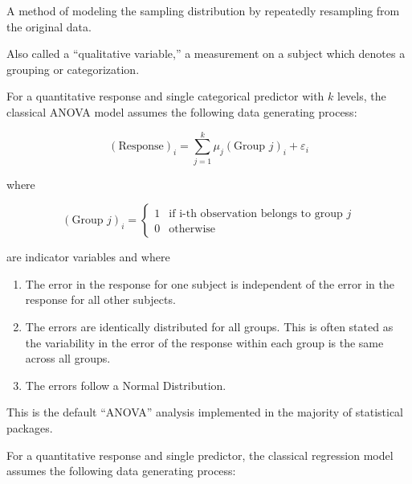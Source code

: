 \documentclass[
  letterpaper,
  DIV=11,
  numbers=noendperiod]{scrreprt}
\providecommand{\tightlist}{%
  \setlength{\itemsep}{0pt}\setlength{\parskip}{0pt}}\usepackage{longtable,booktabs,array}
\theoremstyle{plain}
\theoremstyle{definition}
\theoremstyle{definition}
\theoremstyle{remark}
\begin{document}
\begin{description}
\tightlist
\item[Bootstrapping (Definition~\ref{def-bootstrap})]
A method of modeling the sampling distribution by repeatedly resampling
from the original data.
\item[Categorical Variable (Definition~\ref{def-categorical})]
Also called a ``qualitative variable,'' a measurement on a subject which
denotes a grouping or categorization.
\item[Classical ANOVA Model (Definition~\ref{def-classical-anova})]
For a quantitative response and single categorical predictor with \(k\)
levels, the classical ANOVA model assumes the following data generating
process:
\end{description}

\[(\text{Response})_i = \sum_{j=1}^{k} \mu_j (\text{Group } j)_i + \varepsilon_i\]

where

\[
(\text{Group } j)_{i} = \begin{cases}
  1 & \text{if i-th observation belongs to group } j \\
  0 & \text{otherwise}
  \end{cases}
\]

are indicator variables and where

\begin{enumerate}
\def\labelenumi{\arabic{enumi}.}
\tightlist
\item
  The error in the response for one subject is independent of the error
  in the response for all other subjects.
\item
  The errors are identically distributed for all groups. This is often
  stated as the variability in the error of the response within each
  group is the same across all groups.
\item
  The errors follow a Normal Distribution.
\end{enumerate}

This is the default ``ANOVA'' analysis implemented in the majority of
statistical packages.

\begin{description}
\tightlist
\item[Classical Regression Model
(Definition~\ref{def-classical-regression})]
For a quantitative response and single predictor, the classical
regression model assumes the following data generating process:
\end{description}
\end{document}
